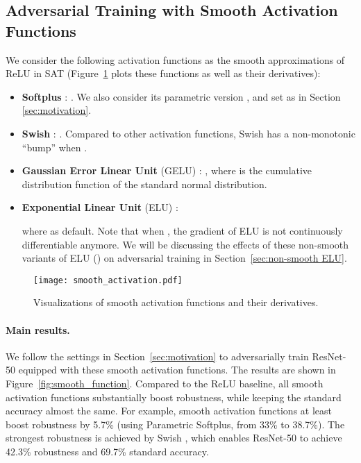 \documentclass{article}
\begin{document}
\subsection{Adversarial Training with Smooth Activation Functions}
We consider the following activation functions as the smooth approximations of ReLU in SAT (Figure~\ref{fig:smooth_activation} plots these functions as well as their derivatives):
\begin{itemize}
[leftmargin=*]
  \setlength\itemsep{0.1em}
  \item \textbf{Softplus} \cite{Nair2010}: . We also consider its parametric version , and set  as in Section \ref{sec:motivation}.

  \item \textbf{Swish} \cite{ramachandran2017searching,elfwing2018sigmoid}: . Compared to other activation functions, Swish has a non-monotonic ``bump''  when .

  \item \textbf{Gaussian Error Linear Unit} (GELU) \cite{hendrycks2016gaussian}: , where  is the cumulative distribution function of the standard normal distribution. 
  
  
  \item \textbf{Exponential Linear Unit} (ELU) \cite{clevert2015fast}:
  
  where  as default. Note that when , the gradient of ELU is not continuously differentiable anymore. We will be discussing the effects of these non-smooth variants of ELU () on adversarial training in Section~\ref{sec:non-smooth ELU}.
\end{itemize}

\begin{figure}[t!]
    \centering
    \texttt{[image: smooth\_activation.pdf]}
    \vspace{-0.5em}
    \caption{Visualizations of smooth activation functions and their derivatives.}
    \label{fig:smooth_activation}
    \vspace{-0.9em}
\end{figure}


\paragraph{Main results.} 
We follow the settings in Section~\ref{sec:motivation} to adversarially train ResNet-50 equipped with these smooth activation functions. The results are shown in Figure~\ref{fig:smooth_function}. Compared to the ReLU baseline, all smooth activation functions substantially boost robustness, while keeping the standard accuracy almost the same. For example, smooth activation functions at least boost robustness by 5.7\% (using Parametric Softplus, from 33\% to 38.7\%). The strongest robustness is achieved by Swish \cite{ramachandran2017searching}, which enables ResNet-50 to achieve 42.3\% robustness and 69.7\% standard accuracy. 
\end{document}
